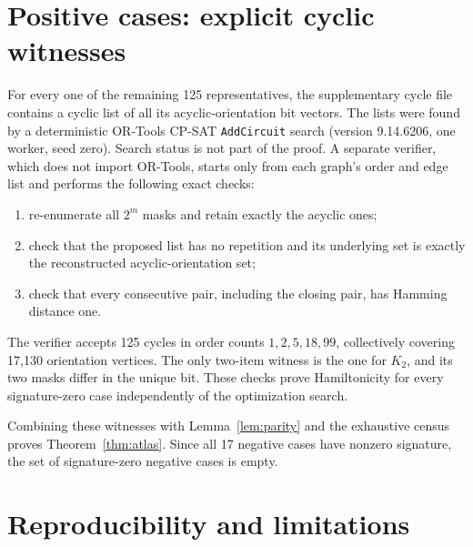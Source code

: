 \documentclass[11pt]{article}
\begin{document}
\section{Positive cases: explicit cyclic witnesses}

For every one of the remaining 125 representatives, the supplementary cycle
file contains a cyclic list of all its acyclic-orientation bit vectors.  The
lists were found by a deterministic OR-Tools CP-SAT \texttt{AddCircuit}
search (version 9.14.6206, one worker, seed zero).  Search status is not part
of the proof.  A separate verifier, which does not import OR-Tools, starts
only from each graph's order and edge list and performs the following exact
checks:
\begin{enumerate}
  \item re-enumerate all $2^m$ masks and retain exactly the acyclic ones;
  \item check that the proposed list has no repetition and its underlying set
        is exactly the reconstructed acyclic-orientation set;
  \item check that every consecutive pair, including the closing pair, has
        Hamming distance one.
\end{enumerate}
The verifier accepts 125 cycles in order counts $1,2,5,18,99$, collectively
covering 17,130 orientation vertices.  The only two-item witness is the one
for $K_2$, and its two masks differ in the unique bit.  These checks prove
Hamiltonicity for every signature-zero case independently of the optimization
search.

Combining these witnesses with Lemma~\ref{lem:parity} and the exhaustive
census proves Theorem~\ref{thm:atlas}.  Since all 17 negative cases have
nonzero signature, the set of signature-zero negative cases is empty.

\section{Reproducibility and limitations}
\end{document}
